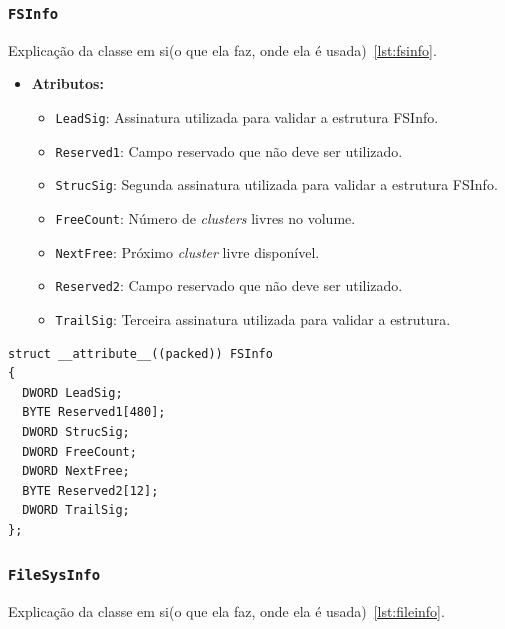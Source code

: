 \documentclass[
    12pt,				%
    oneside,   	        %
    a4paper,			%
    english,			%
    french,				%
    spanish,			%
    brazil,				%
    ]{pacotes/abntex2}
\begin{document}
\subsubsection{\texttt{FSInfo}}
\label{subsubsec:fsinfo}

Explicação da classe em si(o que ela faz, onde ela é usada)~\ref{lst:fsinfo}.

\begin{itemize}
    \item \textbf{Atributos:}
        \begin{itemize}
            \item \texttt{LeadSig}: Assinatura utilizada para validar a estrutura FSInfo.
            \item \texttt{Reserved1}: Campo reservado que não deve ser utilizado.
            \item \texttt{StrucSig}: Segunda assinatura utilizada para validar a estrutura FSInfo.
            \item \texttt{FreeCount}: Número de \textit{clusters} livres no volume.
            \item \texttt{NextFree}: Próximo \textit{cluster} livre disponível.
            \item \texttt{Reserved2}: Campo reservado que não deve ser utilizado.
            \item \texttt{TrailSig}: Terceira assinatura utilizada para validar a estrutura.
        \end{itemize}
\end{itemize}


\begin{lstlisting}[caption={Estrutura que representa o FSInfo encontrado no volume FAT}, label={lst:fsinfo}]
struct __attribute__((packed)) FSInfo
{
  DWORD LeadSig;
  BYTE Reserved1[480]; 
  DWORD StrucSig; 
  DWORD FreeCount; 
  DWORD NextFree; 
  BYTE Reserved2[12]; 
  DWORD TrailSig; 
};
\end{lstlisting}

\subsubsection{\texttt{FileSysInfo}}
\label{subsubsec:file_sys_info}

Explicação da classe em si(o que ela faz, onde ela é usada)~\ref{lst:fileinfo}.
\end{document}
